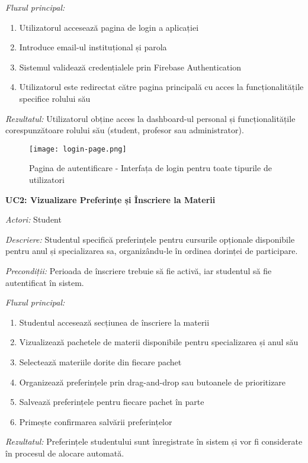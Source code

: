 \documentclass[12pt,a4paper]{report}
\begin{document}
\textit{Fluxul principal:}
\begin{enumerate}
\item Utilizatorul accesează pagina de login a aplicației
\item Introduce email-ul instituțional și parola
\item Sistemul validează credențialele prin Firebase Authentication
\item Utilizatorul este redirectat către pagina principală cu acces la funcționalitățile specifice rolului său
\end{enumerate}

\textit{Rezultatul:} Utilizatorul obține acces la dashboard-ul personal și funcționalitățile corespunzătoare rolului său (student, profesor sau administrator).

\begin{figure}[H]
\centering
\texttt{[image: login-page.png]}
\caption{Pagina de autentificare - Interfața de login pentru toate tipurile de utilizatori}
\label{fig:login-page}
\end{figure}

\textbf{UC2: Vizualizare Preferințe și Înscriere la Materii}

\textit{Actori:} Student

\textit{Descriere:} Studentul specifică preferințele pentru cursurile opționale disponibile pentru anul și specializarea sa, organizându-le în ordinea dorinței de participare.

\textit{Precondiții:} Perioada de înscriere trebuie să fie activă, iar studentul să fie autentificat în sistem.

\textit{Fluxul principal:}
\begin{enumerate}
\item Studentul accesează secțiunea de înscriere la materii
\item Vizualizează pachetele de materii disponibile pentru specializarea și anul său
\item Selectează materiile dorite din fiecare pachet
\item Organizează preferințele prin drag-and-drop sau butoanele de prioritizare
\item Salvează preferințele pentru fiecare pachet în parte
\item Primește confirmarea salvării preferințelor
\end{enumerate}

\textit{Rezultatul:} Preferințele studentului sunt înregistrate în sistem și vor fi considerate în procesul de alocare automată.
\end{document}
